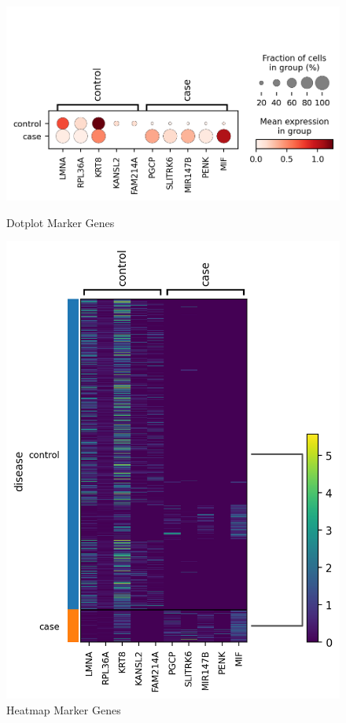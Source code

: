 \begin{figure}[!htb]
  \centering
  \begin{minipage}[t]{0.46\textwidth}
    \centering
    \includegraphics[width=\textwidth]{images/Marker_Gens_Dotplot.png}
    \caption*{\small \foreignlanguage{english}{Dotplot Marker Genes}}
  \end{minipage}
  \hfill
  \begin{minipage}[t]{0.46\textwidth}
    \centering
    \includegraphics[width=\textwidth]{images/Marker_Genes_Heatmap.png}
    \caption*{\small \foreignlanguage{english}{Heatmap Marker Genes}}
  \end{minipage}
\end{figure}

